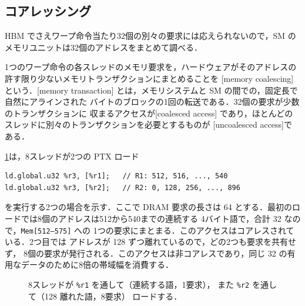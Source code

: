 \documentclass[../main.tex]{subfiles}
\begin{document}
\subsection{コアレッシング}

HBM でさえワープ命令当たり32個の別々の要求には応えられないので，SM の
メモリユニットは32個のアドレスをまとめて調べる．

\begin{definition}[メモリコアレッシング]
  \label{def:l04-coalescing}
  1つのワープ命令の各スレッドのメモリ要求を，ハードウェアがそのアドレスの
  許す限り少ないメモリトランザクションにまとめることを
  [memory coalescing]
  という．[memory transaction]
  とは，メモリシステムと SM の間での，固定長で自然にアラインされた
  バイトのブロックの1回の転送である．32個の要求が少数のトランザクションに
  収まるアクセスが[coalesced access]
  であり，ほとんどのスレッドに別々のトランザクションを必要とするものが
  [uncoalesced access]で
  ある．
\end{definition}

\cref{fig:l04-coalescing}は，8スレッドが2つの PTX ロード
\begin{lstlisting}[language=PTX, numbers=none]
ld.global.u32 %r3, [%r1];   // R1: 512, 516, ..., 540
ld.global.u32 %r3, [%r2];   // R2: 0, 128, 256, ..., 896
\end{lstlisting}
を実行する2つの場合を示す．ここで DRAM 要求の長さは \SI{64}{\byte}
とする．最初のロードでは8個のアドレスは512から540までの連続する
4バイト語で，合計 \SI{32}{\byte} なので，\texttt{Mem[512--575]} への
1つの要求にまとまる．このアクセスはコアレスされている．2つ目では
アドレスが \SI{128}{\byte} ずつ離れているので，どの2つも要求を共有せず，
8個の要求が発行される．このアクセスは非コアレスであり，同じ
\SI{32}{\byte} の有用なデータのために8倍の帯域幅を消費する．

\begin{figure}[htbp]
  \centering
  
  \caption{8スレッドが \texttt{\%r1} を通して（連続する語，1要求），
    また \texttt{\%r2} を通して（\SI{128}{\byte} 離れた語，8要求）
    ロードする．}
  \label{fig:l04-coalescing}
\end{figure}
\end{document}

